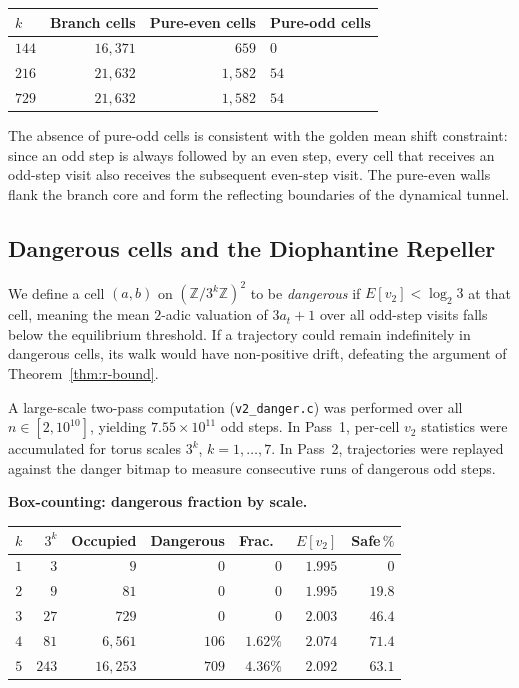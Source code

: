 \documentclass[manuscript]{aomart}
\newcommand{\Z}{\mathbb{Z}}
\theoremstyle{plain}
\theoremstyle{definition}
\theoremstyle{remark}
\numberwithin{equation}{section}
\begin{document}
\begin{center}
\renewcommand{\arraystretch}{1.3}
\begin{tabular}{lrrl}
  \toprule
  \textbf{$k$} & \textbf{Branch cells} & \textbf{Pure-even cells}
  & \textbf{Pure-odd cells} \\
  \midrule
  $144$ & $16{,}371$ & $659$ & $0$ \\
  $216$ & $21{,}632$ & $1{,}582$ & $54$ \\
  $729$ & $21{,}632$ & $1{,}582$ & $54$ \\
  \bottomrule
\end{tabular}
\end{center}

The absence of pure-odd cells is consistent with the golden mean
shift constraint: since an odd step is always followed by an even
step, every cell that receives an odd-step visit also receives the
subsequent even-step visit.  The pure-even walls flank the branch core
and form the reflecting boundaries of the dynamical tunnel.

\subsection{Dangerous cells and the Diophantine Repeller}
\label{sec:v2-danger}

We define a cell $(a, b)$ on $(\Z/3^k\Z)^2$ to be \emph{dangerous} if
$E[v_2] < \log_2 3$ at that cell, meaning the mean $2$-adic valuation
of $3a_t + 1$ over all odd-step visits falls below the equilibrium
threshold.  If a trajectory could remain indefinitely in dangerous
cells, its walk would have non-positive drift, defeating the argument
of Theorem~\ref{thm:r-bound}.

A large-scale two-pass computation (\texttt{v2\_danger.c}) was
performed over all $n \in [2, 10^{10}]$, yielding
$7.55 \times 10^{11}$ odd steps.  In Pass~1, per-cell $v_2$
statistics were accumulated for torus scales $3^k$, $k = 1, \ldots, 7$.
In Pass~2, trajectories were replayed against the danger bitmap to
measure consecutive runs of dangerous odd steps.

\medskip\noindent
\textbf{Box-counting: dangerous fraction by scale.}

\begin{center}
\renewcommand{\arraystretch}{1.3}
\begin{tabular}{rrrrrrr}
  \toprule
  $k$ & $3^k$ & Occupied & Dangerous & Frac.\
  & $E[v_2]$ & Safe\,$\%$ \\
  \midrule
  $1$ & $3$ & $9$ & $0$ & $0$ & $1.995$ & $0$ \\
  $2$ & $9$ & $81$ & $0$ & $0$ & $1.995$ & $19.8$ \\
  $3$ & $27$ & $729$ & $0$ & $0$ & $2.003$ & $46.4$ \\
  $4$ & $81$ & $6{,}561$ & $106$ & $1.62\%$ & $2.074$ & $71.4$ \\
  $5$ & $243$ & $16{,}253$ & $709$ & $4.36\%$ & $2.092$ & $63.1$ \\
  \bottomrule
\end{tabular}
\end{center}
\end{document}
